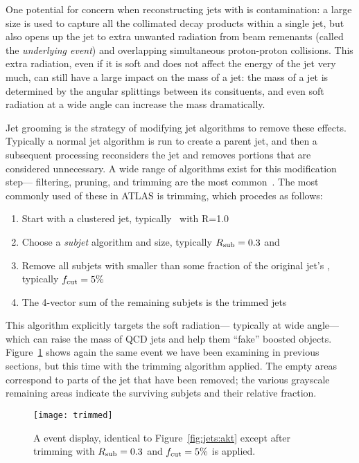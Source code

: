 One potential for concern when reconstructing jets with \largeR is contamination: a large size is used to capture all the collimated decay products within a single jet, but also opens up the jet to extra unwanted radiation from beam remenants (called the \textit{underlying event}) and overlapping simultaneous proton-proton collisions. This extra radiation, even if it is soft and does not affect the energy of the jet very much, can still have a large impact on the mass of a jet: the mass of a jet is determined by the angular splittings between its consituents, and even soft radiation at a wide angle can increase the mass dramatically.

Jet grooming is the strategy of modifying jet algorithms to remove these effects. Typically a normal jet algorithm is run to create a parent jet, and then a subsequent processing reconsiders the jet and removes portions that are considered unnecessary. A wide range of algorithms exist for this modification step--- filtering, pruning, and trimming are the most common~. The most commonly used of these in ATLAS is trimming, which procedes as follows:
%
\begin{enumerate}
\item Start with a clustered \largeR jet, typically \antikt\ with R=1.0
\item Choose a \textit{subjet} algorithm and size, typically $R_{\rm sub} = 0.3$ and \kt
\item Remove all subjets with \pt smaller than some fraction \fcut of the original jet's \pt, typically $f_{\rm cut}  = 5\%$
\item The 4-vector sum of the remaining subjets is the trimmed jets
\end{enumerate}
%
This algorithm explicitly targets the soft radiation--- typically at wide angle--- which can raise the mass of QCD jets and help them ``fake'' boosted objects. Figure~\ref{fig:jets:trimmed} shows again the same event we have been examining in previous sections, but this time with the trimming algorithm applied. The empty areas correspond to parts of the jet that have been removed; the various grayscale remaining areas indicate the surviving subjets and their relative \pt fraction. 



\begin{figure}
\centering
\texttt{[image: trimmed]}
\label{fig:jets:trimmed}
\caption{A event display, identical to Figure~\ref{fig:jets:akt} except after trimming with $R_{\rm sub} = 0.3$ and $f_{\rm cut} = 5\%$ is applied.}
\end{figure}

